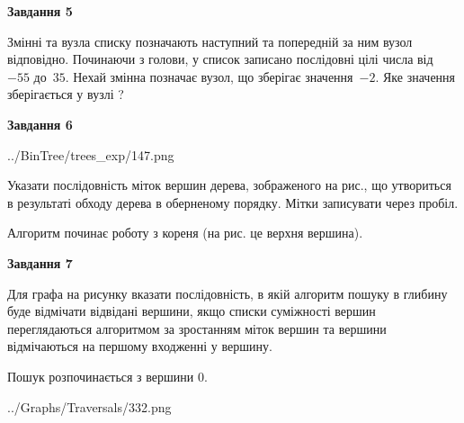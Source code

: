 \documentclass[12pt, ukrainian]{article}
\begin{document}
{\begin {large}
{\begin {center}\textbf{Завдання 5}\end {center}}\par
Змінні  та  вузла списку позначають наступний та попередній за ним вузол відповідно. Починаючи з голови, у список записано послідовні цілі числа від~$-55$ до~$35$. Нехай змінна  позначає вузол, що зберігає значення~$-2$.
Яке значення зберігається у вузлі  ?\par
\newpage

{\begin {center}\textbf{Завдання 6}\end {center}}\par

\begin{center}
	{../BinTree/trees_exp/147.png}
\end{center}
Указати послідовність міток вершин дерева, зображеного на рис., що утвориться в результаті обходу дерева в оберненому порядку. Мітки записувати через пробіл.\par Алгоритм починає роботу з кореня (на рис. це верхня вершина).\par
\newpage

{\begin {center}\textbf{Завдання 7}\end {center}}\par
Для графа на рисунку вказати послідовність, в якій алгоритм пошуку в глибину буде відмічати відвідані вершини, якщо списки суміжності вершин переглядаються алгоритмом за зростанням міток вершин та вершини відмічаються на першому вход\-женні у вершину.\par
Пошук розпочинається з вершини 0.\par

\begin{center}
	{../Graphs/Traversals/332.png}
\end{center}\par
\newpage


\end{large}}
\end{document}
